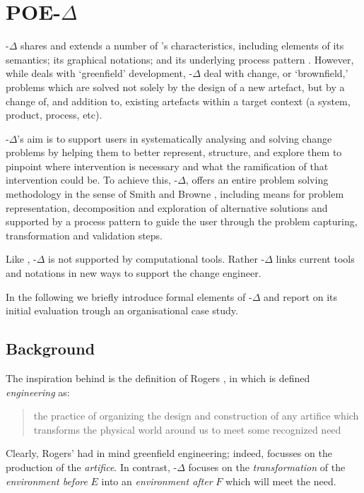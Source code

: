 \documentclass[runningheads,a4paper]{llncs}
\begin{document}
\section{POE-$\Delta$}
\label{sect:POEDelta}
\POE{}-$\Delta$ shares and extends a number of \POE{}'s characteristics, including elements of its semantics; its graphical notations; and its underlying process pattern \cite{Hall2009JAdvSysMeas}. However, while \POE{} deals with `greenfield' development, \POE{}-$\Delta$ deal with change, or  `brownfield,' problems which are solved not solely by the design of a new artefact, but by a change of, and addition to, existing artefacts within a target context (a system, product, process, etc).

\POE{}-$\Delta$'s aim is to support users in systematically analysing and solving change problems by helping them to better represent, structure, and explore them to pinpoint where intervention is necessary and what the ramification of that intervention could be. To achieve this, \POE{}-$\Delta$, offers an entire problem solving methodology in the sense of Smith and Browne \cite{smith1993conceptual}, including means for problem representation, decomposition and exploration of alternative solutions and supported by a process pattern to guide the user through the problem capturing, transformation and validation steps.

Like \POE{}, \POE{}-$\Delta$ is not supported by computational tools. Rather \POE{}-$\Delta$ links current tools and notations in new ways to support the change engineer.

In the following we briefly introduce formal elements of \POE{}-$\Delta$ and report on its initial evaluation trough an organisational case study.

\subsection{Background}
\label{theory}

The inspiration behind \POE{} is the definition of Rogers \cite{rogers1983nature}, in which is defined \textit{engineering} as:
%
\begin{quotation}
 the practice of organizing the design and construction of any artifice which transforms the physical world around us to meet some recognized need 
\end{quotation}
%
Clearly, Rogers' had in mind greenfield engineering; indeed, \POE{} focusses on the production of the \textit{artifice}. In contrast, \POE{}-$\Delta$ focuses on the \textit{transformation} of the \textit{environment before} $E$ into an \textit{environment after} $F$ which will meet the need.
\end{document}

